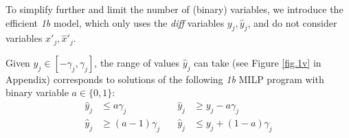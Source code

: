 	

	To simplify further and limit the number of (binary) variables, 
    we introduce the efficient {\em 1b} model, which only uses the {\em diff} variables $y_j,\hat{y}_j$, and do not consider variables $x'_j,\hat{x}'_j$. 
    

    \begin{proposition}
    \label{prop3}
    Given $y_j \in [-\gamma_j,\gamma_j]$, 
the range of values $\hat{y}_j$ can take (see Figure \ref{fig.1v} in Appendix) corresponds to solutions of the following {\em 1b} MILP program with binary variable $a \in \{0,1\}$:
	\begin{align*}
		\hat{y}_j &\leq a \gamma_j               &\quad \hat{y}_j &\geq y_j - a \gamma_j \\
		\hat{y}_j &\geq (a-1) \gamma_j           &\quad \hat{y}_j &\leq y_j + (1-a) \gamma_j
	\end{align*} 
	\end{proposition}

